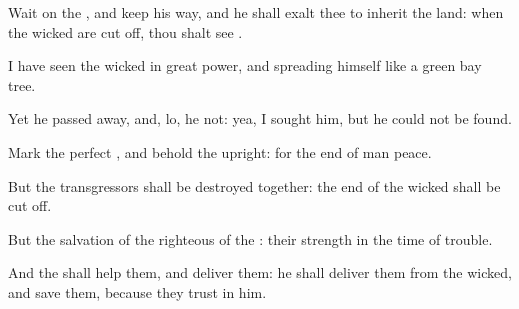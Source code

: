 {\Q {}Wait on the
{}, and
keep his
way, and he shall
exalt thee to
inherit the
land: when the
wicked are cut
off, thou shalt
see
{}.


\par }{\Q {}I have
seen the
wicked in great
power, and
spreading himself like a
green bay
tree.


\par }{\Q {}Yet he passed
away, and, lo, he
{} not: yea, I
sought him, but he could not be
found.


\par }{\Q {}Mark the
perfect
{}, and
behold the
upright: for the
end of
{}
man
{}
peace.


\par }{\Q {}But the
transgressors shall be
destroyed
together: the
end of the
wicked shall be cut
off.


\par }{\Q {}But the
salvation of the
righteous
{} of the
{}:
{} their
strength in the
time of
trouble.


\par }{\Q {}And the
{} shall
help them, and
deliver them: he shall
deliver them from the
wicked, and
save them, because they
trust in him.




\par }
